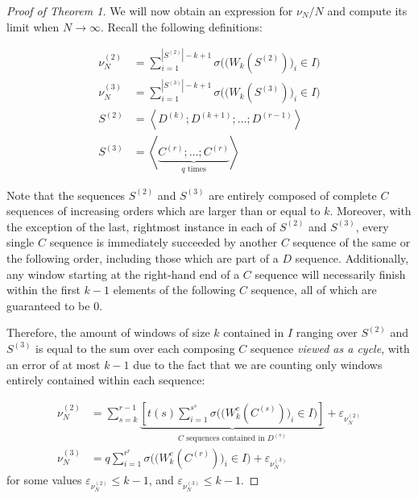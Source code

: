 \documentclass[11pt,a4paper]{tesis}
\theoremstyle{plain}
\theoremstyle{definition}
\begin{document}
\begin{proof}[Proof of Theorem 1]

  We will now obtain an expression for $\nu_N / N$ and compute its limit when $N \to \infty$. Recall the following definitions:

  \begin{equation*}
    \begin{aligned}
      \nu^{(2)}_N & = \sum_{i = 1}^{|S^{(2)}| - k + 1} \sigma\Big( \big( W_k(S^{(2)}) \big)_i \in I \Big) \\
      \nu^{(3)}_N & = \sum_{i = 1}^{|S^{(3)}| - k + 1} \sigma\Big( \big( W_k(S^{(3)}) \big)_i \in I \Big) \\
      S^{(2)} & = \left< D^{(k)} ; D^{(k + 1)} ; \dots ; D^{(r - 1)} \right> \\
      S^{(3)} & = \left< \underbrace{C^{(r)} ; \dots ; C^{(r)}}_{q \text{ times}} \right>
    \end{aligned}
  \end{equation*}

  Note that the sequences $S^{(2)}$ and $S^{(3)}$ are entirely composed of complete $C$ sequences of increasing orders which are larger than or equal to $k$. Moreover, with the exception of the last, rightmost instance in each of $S^{(2)}$ and $S^{(3)}$, every single $C$ sequence is immediately succeeded by another $C$ sequence of the same or the following order, including those which are part of a $D$ sequence. Additionally, any window starting at the right-hand end of a $C$ sequence will necessarily finish within the first $k - 1$ elements of the following $C$ sequence, all of which are guaranteed to be $0$.

  Therefore, the amount of windows of size $k$ contained in $I$ ranging over $S^{(2)}$ and $S^{(3)}$ is equal to the sum over each composing $C$ sequence \textit{viewed as a cycle}, with an error of at most $k - 1$ due to the fact that we are counting only windows entirely contained within each sequence:

  \begin{equation*}
    \begin{aligned}
      \nu^{(2)}_N & = \sum_{s = k}^{r - 1} \underbrace{\left[ t(s) \sum_{i = 1}^{s^s} \sigma\Big( \big( W^c_k(C^{(s)}) \big)_i \in I \Big) \right]}_{\text{$C$ sequences contained in $D^{(s)}$}} + \varepsilon_{\nu^{(2)}_N} \\
      \nu^{(3)}_N & = q \sum_{i = 1}^{r^r} \sigma\Big( \big( W^c_k(C^{(r)}) \big)_i \in I \Big)  + \varepsilon_{\nu^{(3)}_N}
    \end{aligned}
  \end{equation*}
  for some values $\varepsilon_{\nu^{(2)}_N} \le k - 1$, and $\varepsilon_{\nu^{(3)}_N} \le k - 1$.


\end{proof}
\end{document}
